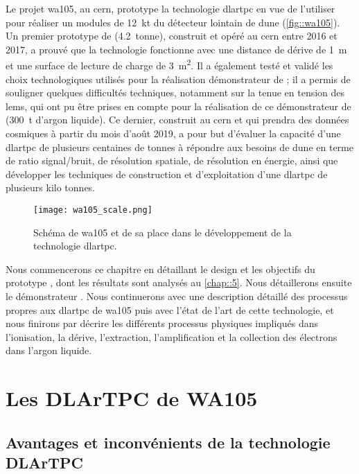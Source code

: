     Le projet \gls{wa105}, au \gls{cern}, prototype la technologie \gls{dlartpc} en vue de l'utiliser pour réaliser un modules de \SI{12}{\kilo\tonne} du détecteur lointain de \gls{dune} (\autoref{fig::wa105}). Un premier prototype de \TOO{} (\SI{4.2}{tonne}), construit et opéré au \gls{cern} entre 2016 et 2017, a prouvé que la technologie fonctionne avec une distance de dérive de \SI{1}{\meter} et une surface de lecture de charge de \SI{3}{\meter\squared}. Il a également testé et validé les choix technologiques utilisés pour la réalisation démonstrateur de \protodp{}; il a permis de souligner quelques difficultés techniques, notamment sur la tenue en tension des \glspl{lem}, qui ont pu être prises en compte pour la réalisation de ce démonstrateur de \SSS{} (\SI{300}{\tonne} d'argon liquide). Ce dernier, construit au \gls{cern} et qui prendra des données cosmiques à partir du mois d'août 2019, a pour but d'évaluer la capacité d'une \gls{dlartpc} de plusieurs centaines de tonnes à répondre aux besoins de \gls{dune} en terme de ratio signal/bruit, de résolution spatiale, de résolution en énergie, ainsi que développer les techniques de construction et d'exploitation d'une \gls{dlartpc} de plusieurs kilo tonnes.

    \begin{figure}[htbp]
      \centering
      \texttt{[image: wa105\_scale.png]}        
      \caption[Schéma de .]{\label{fig::wa105}Schéma de \gls{wa105} et de sa place dans le développement de la technologie \gls{dlartpc}.}
    \end{figure}

    Nous commencerons ce chapitre en détaillant le design et les objectifs du prototype \TOO{}, dont les résultats sont analysés au \autoref{chap::5}. Nous détaillerons ensuite le démonstrateur \SSS{}. Nous continuerons avec une description détaillé des processus propres aux \gls{dlartpc} de \gls{wa105} puis avec l'état de l'art de cette technologie, et nous finirons par décrire les différents processus physiques impliqués dans l'ionisation, la dérive, l'extraction, l'amplification et la collection des électrons dans l'argon liquide.

  \section{Les DLArTPC de WA105}

    \subsection{Avantages et inconvénients de la technologie DLArTPC}

